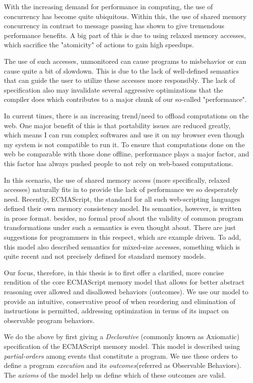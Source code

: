      
With the increasing demand for performance in computing, the use of concurrency has become quite ubiquitous. 
Within this, the use of shared memory concurrency in contrast to message passing has shown to give tremendous performance benefits. 
A big part of this is due to using relaxed memory accesses, which sacrifice the "atomicity" of actions to gain high speedups. 

The use of such accesses, unmonitored can cause programs to misbehavior or can cause quite a bit of slowdown. 
This is due to the lack of well-defined semantics that can guide the user to utilize these accesses more responsibly.
The lack of specification also may invalidate several aggressive optimizations that the compiler does which contributes to a major chunk of our so-called "performance".

In current times, there is an increasing trend/need to offload computations on the web. 
One major benefit of this is that portability issues are reduced greatly, which means I can run complex softwares and use it on my browser even though my system is not compatible to run it. 
To ensure that computations done on the web be comparable with those done offline, performance plays a major factor, and this factor has always pushed people to not rely on web-based computations. 

In this scenario, the use of shared memory access (more specifically, relaxed accesses) naturally fits in to provide the lack of performance we so desperately need.
Recently, ECMAScript, the standard for all such web-scripting languages defined their own memory consistency model.
Its semantics, however, is written in prose format. 
besides, no formal proof about the validity of common program transformations under such a semantics is even thought about.
There are just suggestions for programmers in this respect, which are example driven.
To add, this model also described semantics for mixed-size accesses, something which is quite recent and not precisely defined for standard memory models. 

Our focus, therefore, in this thesis is to first offer a clarified, more concise rendition of the core ECMAScript memory model that allows for better abstract reasoning over allowed and disallowed behaviors (outcomes). 
We use our model to provide an intuitive, conservative proof of when reordering and elimination of instructions is permitted, addressing optimization in terms of its impact on observable program behaviors. 

We do the above by first giving a \textit{Declarative} (commonly known as Axiomatic) specification of the ECMAScript memory model. 
This model is described using \textit{partial-orders} among events that constitute a program.
We use these orders to define a program \textit{execution} and its \textit{outcomes}(referred as Observable Behaviors).
The \textit{axioms} of the model help us define which of these outcomes are valid.

